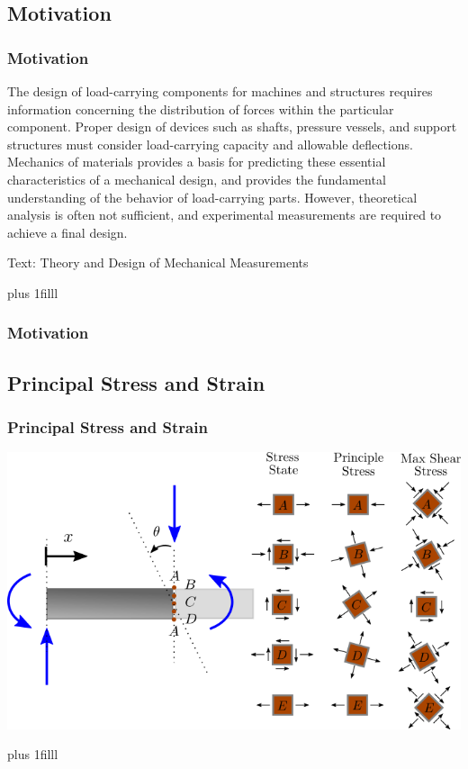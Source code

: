 \documentclass[fleqn]{beamer} %
\newcommand{\sectionIIIsubsectionItitle}{Motivation}
\newcommand{\sectionIIIsubsectionIItitle}{Principal Stress and Strain}
\newcommand{\btVFill}{\vskip0pt plus 1filll}
\begin{document}
		\subsection{\sectionIIIsubsectionItitle}\label{sectionIIIsubsectionI}

			\begin{frame}
				\frametitle{\sectionIIIsubsectionItitle}

				\bigskip

				The design of load-carrying components for machines and structures requires information concerning the {\BL distribution of forces within the particular component}. Proper design of devices such as shafts, pressure vessels, and support structures must consider {\PR load-carrying capacity and allowable deflections}. Mechanics of materials provides a basis for predicting these essential characteristics of a mechanical design, and provides the fundamental understanding of the behavior of load-carrying parts. However, theoretical analysis is often not sufficient, and {\PN experimental measurements} are required to achieve a final design.

				{\tiny Text: Theory and Design of Mechanical Measurements}

				\btVFill
			
			\end{frame}

			\begin{frame}
				\frametitle{\sectionIIIsubsectionItitle}
		
			\end{frame}

		\subsection{\sectionIIIsubsectionIItitle}\label{sectionIIIsubsectionII}	

			\begin{frame}
				\frametitle{\sectionIIIsubsectionIItitle}

				\bigskip

				\includegraphics[scale=.5]{images/stress_states.png}

				\btVFill

			\end{frame}
\end{document}

